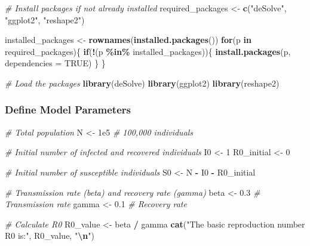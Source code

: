 \documentclass[
]{article}
\newenvironment{Shaded}{\begin{snugshade}}{\end{snugshade}}
\newcommand{\AttributeTok}[1]{\textcolor[rgb]{0.13,0.29,0.53}{#1}}
\newcommand{\CommentTok}[1]{\textcolor[rgb]{0.56,0.35,0.01}{\textit{#1}}}
\newcommand{\ConstantTok}[1]{\textcolor[rgb]{0.56,0.35,0.01}{#1}}
\newcommand{\ControlFlowTok}[1]{\textcolor[rgb]{0.13,0.29,0.53}{\textbf{#1}}}
\newcommand{\DecValTok}[1]{\textcolor[rgb]{0.00,0.00,0.81}{#1}}
\newcommand{\FloatTok}[1]{\textcolor[rgb]{0.00,0.00,0.81}{#1}}
\newcommand{\FunctionTok}[1]{\textcolor[rgb]{0.13,0.29,0.53}{\textbf{#1}}}
\newcommand{\NormalTok}[1]{#1}
\newcommand{\OtherTok}[1]{\textcolor[rgb]{0.56,0.35,0.01}{#1}}
\newcommand{\SpecialCharTok}[1]{\textcolor[rgb]{0.81,0.36,0.00}{\textbf{#1}}}
\newcommand{\StringTok}[1]{\textcolor[rgb]{0.31,0.60,0.02}{#1}}
\begin{document}
\begin{Shaded}
\begin{Highlighting}[]
\CommentTok{\# Install packages if not already installed}
\NormalTok{required\_packages }\OtherTok{\textless{}{-}} \FunctionTok{c}\NormalTok{(}\StringTok{"deSolve"}\NormalTok{, }\StringTok{"ggplot2"}\NormalTok{, }\StringTok{"reshape2"}\NormalTok{)}

\NormalTok{installed\_packages }\OtherTok{\textless{}{-}} \FunctionTok{rownames}\NormalTok{(}\FunctionTok{installed.packages}\NormalTok{())}
\ControlFlowTok{for}\NormalTok{(p }\ControlFlowTok{in}\NormalTok{ required\_packages)\{}
  \ControlFlowTok{if}\NormalTok{(}\SpecialCharTok{!}\NormalTok{(p }\SpecialCharTok{\%in\%}\NormalTok{ installed\_packages))\{}
    \FunctionTok{install.packages}\NormalTok{(p, }\AttributeTok{dependencies =} \ConstantTok{TRUE}\NormalTok{)}
\NormalTok{  \}}
\NormalTok{\}}


\CommentTok{\# Load the packages}
\FunctionTok{library}\NormalTok{(deSolve)}
\FunctionTok{library}\NormalTok{(ggplot2)}
\FunctionTok{library}\NormalTok{(reshape2)}
\end{Highlighting}
\end{Shaded}

\hypertarget{define-model-parameters}{%
\subsubsection{Define Model Parameters}\label{define-model-parameters}}

\begin{Shaded}
\begin{Highlighting}[]
\CommentTok{\# Total population}
\NormalTok{N }\OtherTok{\textless{}{-}} \FloatTok{1e5}  \CommentTok{\# 100,000 individuals}

\CommentTok{\# Initial number of infected and recovered individuals}
\NormalTok{I0 }\OtherTok{\textless{}{-}} \DecValTok{1}
\NormalTok{R0\_initial }\OtherTok{\textless{}{-}} \DecValTok{0}

\CommentTok{\# Initial number of susceptible individuals}
\NormalTok{S0 }\OtherTok{\textless{}{-}}\NormalTok{ N }\SpecialCharTok{{-}}\NormalTok{ I0 }\SpecialCharTok{{-}}\NormalTok{ R0\_initial}

\CommentTok{\# Transmission rate (beta) and recovery rate (gamma)}
\NormalTok{beta }\OtherTok{\textless{}{-}} \FloatTok{0.3}    \CommentTok{\# Transmission rate}
\NormalTok{gamma }\OtherTok{\textless{}{-}} \FloatTok{0.1}   \CommentTok{\# Recovery rate}

\CommentTok{\# Calculate R0}
\NormalTok{R0\_value }\OtherTok{\textless{}{-}}\NormalTok{ beta }\SpecialCharTok{/}\NormalTok{ gamma}
\FunctionTok{cat}\NormalTok{(}\StringTok{"The basic reproduction number R0 is:"}\NormalTok{, R0\_value, }\StringTok{"}\SpecialCharTok{\textbackslash{}n}\StringTok{"}\NormalTok{)}
\end{Highlighting}
\end{Shaded}
\end{document}
